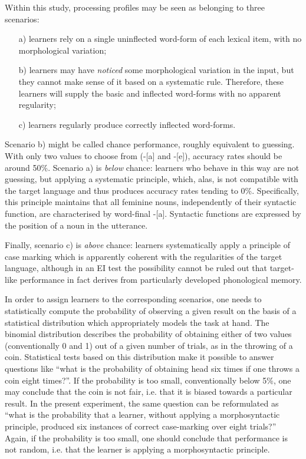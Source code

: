 Within this study, processing profiles may be seen as belonging to three scenarios: 

\begin{itemize}
    \item[a)] learners rely on a single uninflected word-form of each lexical item, with no morphological variation;
    \item[b)] learners may have \textit{noticed} some morphological variation in the input, but they cannot make sense of it based on a systematic rule. Therefore, these learners will supply the basic and inflected word-forms with no apparent regularity;
    \item[c)] learners regularly produce correctly inflected word-forms.
\end{itemize}

Scenario b) might be called chance performance, roughly equivalent to guessing. With only two values to choose from (-[a] and -[e]), accuracy rates should be around 50\%. Scenario a) is \textit{below} chance: learners who behave in this way are not guessing, but applying a systematic principle, which, alas, is not compatible with the target language and thus produces accuracy rates tending to 0\%. Specifically, this principle maintains that all feminine nouns, independently of their syntactic function, are characterised by word-final -[a]. Syntactic functions are expressed by the position of a noun in the utterance.

Finally, scenario c) is \textit{above} chance: learners systematically apply a principle of case marking which is apparently coherent with the regularities of the target language, although in an EI test the possibility cannot be ruled out that target-like performance in fact derives from particularly developed phonological memory.

In order to assign learners to the corresponding scenarios, one needs to statistically compute the probability of observing a given result on the basis of a statistical distribution which appropriately models the task at hand. The binomial distribution describes the probability of obtaining either of two values (conventionally 0 and 1) out of a given number of trials, as in the throwing of a coin. Statistical tests based on this distribution make it possible to answer  questions like ``what is the probability of obtaining head six times if one throws a coin eight times?''. If the probability is too small, conventionally below 5\%, one may conclude that the coin is not fair, i.e. that it is biased towards a particular result. In the present experiment, the same question can be reformulated as ``what is the probability that a learner, without applying a morphosyntactic principle, produced six instances of correct case-marking over eight trials?'' Again, if the probability is too small, one should conclude that performance is not random, i.e. that the learner is applying a morphosyntactic principle.

